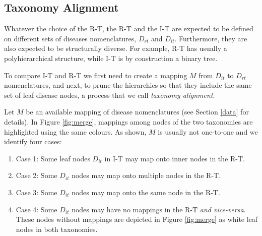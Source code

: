 \documentclass[journal,twoside,web]{ieeecolor}
\begin{document}
\subsection{Taxonomy Alignment}
\label{sec:alignment algorithms}
Whatever the choice of the R-T, the R-T and the I-T are expected to be defined on different sets of diseases nomenclatures, $D_{rt}$ and $D_{it}$. Furthermore, they are also expected to be structurally diverse. For example, R-T has usually a polyhierarchical structure, while I-T is by construction a binary tree.

To compare I-T and R-T we first need to create a mapping $M$  from
 $D_{it}$ to $D_{rt}$ nomenclatures, and next, to prune the hierarchies so that they include the same set of leaf disease nodes, a process that we call  \textit{taxonomy alignment}.  
 
 
  Let $M$ be an available mapping of disease nomenclatures (see Section \ref{data} for details).  In  Figure \ref{fig:merge}, mappings among nodes of the two taxonomies are highlighted using the same colours. As shown,  $M$ is usually not one-to-one and we identify four cases:

\begin{enumerate}
    \item Case 1: Some leaf nodes $D_{it}$ in I-T may map onto inner nodes in the R-T.
    
    \item Case 2: Some  $D_{it}$  nodes may map onto multiple nodes in the R-T.
    
    \item Case 3: Some  $D_{it}$ nodes may map onto the same node in the R-T.
    
    \item Case 4: Some  $D_{it}$ nodes may have no mappings in the R-T \textit{and vice-versa}. These  nodes without mappings are depicted in Figure \ref{fig:merge} as  white leaf nodes in both taxonomies. 
    
\end{enumerate}
\end{document}
